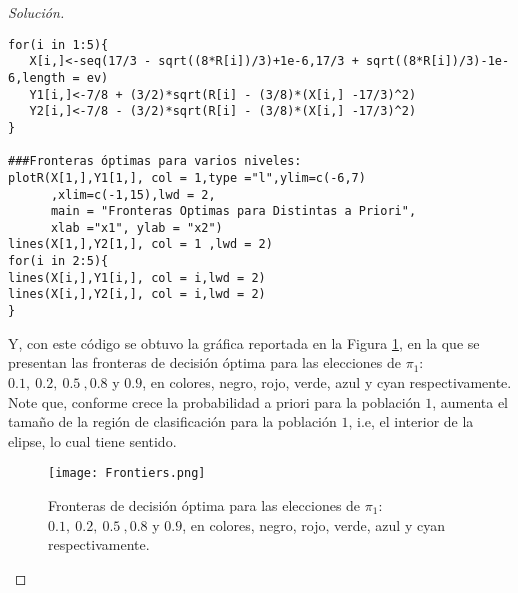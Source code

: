 \documentclass[10.5pt,notitlepage]{article}
\newenvironment{solucion}
  {\begin{proof}[Solución]}
  {\end{proof}}
\theoremstyle{plain}
\begin{document}
\begin{solucion}
\begin{verbatim}
for(i in 1:5){
   X[i,]<-seq(17/3 - sqrt((8*R[i])/3)+1e-6,17/3 + sqrt((8*R[i])/3)-1e-6,length = ev)
   Y1[i,]<-7/8 + (3/2)*sqrt(R[i] - (3/8)*(X[i,] -17/3)^2)
   Y2[i,]<-7/8 - (3/2)*sqrt(R[i] - (3/8)*(X[i,] -17/3)^2)
}

###Fronteras óptimas para varios niveles:
plotR(X[1,],Y1[1,], col = 1,type ="l",ylim=c(-6,7)
      ,xlim=c(-1,15),lwd = 2,
      main = "Fronteras Optimas para Distintas a Priori",
      xlab ="x1", ylab = "x2")
lines(X[1,],Y2[1,], col = 1 ,lwd = 2)
for(i in 2:5){
lines(X[i,],Y1[i,], col = i,lwd = 2)
lines(X[i,],Y2[i,], col = i,lwd = 2)
}
\end{verbatim}
Y, con este código se obtuvo la gráfica reportada en la Figura \ref{fig:1}, en la que se presentan las fronteras de decisión óptima para las elecciones de \(\pi_1\): \(0.1, \ 0.2, \ 0.5\ ,0.8\) y \(0.9\), en colores, negro, rojo, verde, azul y cyan respectivamente. Note que, conforme crece la probabilidad a priori para la población \(1\), aumenta el tamaño de la región de clasificación para la población \(1\), i.e, el interior de la elipse, lo cual tiene sentido.
\begin{figure}[htb]
    \centering
    \texttt{[image: Frontiers.png]}
    \caption{Fronteras de decisión óptima para las elecciones de \(\pi_1\): \(0.1, \ 0.2, \ 0.5\ ,0.8\) y \(0.9\), en colores, negro, rojo, verde, azul y cyan respectivamente.}
    \label{fig:1}
\end{figure}
\end{solucion}
\end{document}
